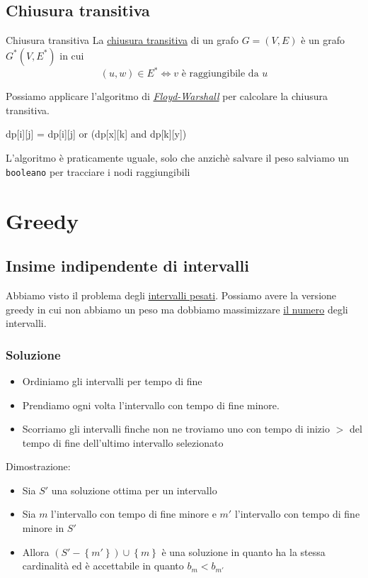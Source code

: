 \subsection{Chiusura transitiva}
\begin{definizione}{Chiusura transitiva}
	La \underline{chiusura transitiva} di un grafo $ G = \left(V, E\right) $ è un grafo $ G^{*} \left(V, E^{*}\right) $ in cui
	\[
		\left(u,w\right) \in E^{*} \Leftrightarrow v \text{ è raggiungibile da }  u
	\]
\end{definizione}


Possiamo applicare l'algoritmo di \hyperref[Floyd-Warshall]{\textit{Floyd-Warshall}} per calcolare la chiusura transitiva.

\begin{center}
	\ttfamily
	dp[i][j] = dp[i][j] or  (dp[x][k] and dp[k][y])
\end{center}
L'algoritmo è praticamente uguale, solo che anzichè salvare il peso salviamo un \verb|booleano| per tracciare i nodi raggiungibili
\section{Greedy}
\subsection{Insime indipendente di intervalli}
Abbiamo visto il problema degli \hyperref[intervalli pesati]{intervalli pesati}. Possiamo avere la versione greedy in cui non abbiamo un peso ma dobbiamo massimizzare \underline{il numero} degli intervalli.
\subsubsection{Soluzione}
\begin{itemize}
	\item Ordiniamo gli intervalli per tempo di fine
	\item Prendiamo ogni volta l'intervallo con tempo di fine minore.
	\item Scorriamo gli intervalli finche non ne troviamo uno con tempo di inizio $ > $ del tempo di fine dell'ultimo intervallo selezionato
\end{itemize}
Dimostrazione:
\begin{itemize}
	\item Sia $ S' $ una soluzione ottima per un intervallo
	\item Sia $ m $ l'intervallo con tempo di fine minore e $ m' $ l'intervallo con tempo di fine minore in $ S' $
	\item Allora $ \left(S'- \left\{m'\right\}\right) \cup \left\{m\right\} $ è una soluzione in quanto ha la stessa cardinalità ed è accettabile in quanto $ b_m < b_{m'} $
\end{itemize}
